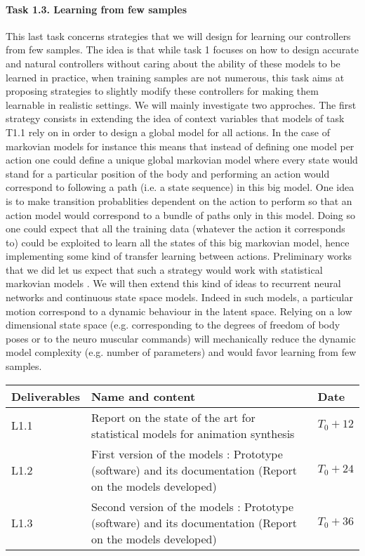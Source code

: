 \paragraph{Task 1.3. Learning from few samples}
This last task concerns strategies that we will design for learning our controllers from few samples. The idea is that while task 1 focuses on how to design accurate and natural controllers without caring about the ability of these models to be learned in practice, when training samples are not numerous, this task aims at proposing strategies to slightly modify these controllers for making them learnable in realistic settings.
We will mainly investigate two approches. The first strategy consists in extending the idea of context variables that models of task T1.1 rely on in order to design a global model for all actions. In the case of markovian models for instance this means that instead of defining one model per action one could define a unique global markovian model where every state would stand for a particular position of the body and performing an action would correspond to following a path (i.e. a state sequence) in this big model. 
One idea is to make transition probablities dependent on the action to perform so that an action model would correspond to a bundle of paths only in this model.  Doing so one could expect that all the training data (whatever the action it corresponds to) could be exploited to learn all the states of this big markovian model, hence implementing some kind of transfer learning between actions.  Preliminary works that we did let us expect that such a strategy would work with statistical markovian models \cite{DBLP:conf/icassp/DingRAP13, Radenen2014}. We will then extend this kind of ideas to recurrent neural networks and continuous state space models. Indeed in such models, a particular motion correspond to a dynamic behaviour in the latent space. Relying on a low dimensional state space (e.g. corresponding to the degrees of freedom of body poses or to the neuro muscular commands) will mechanically reduce the dynamic model complexity (e.g. number of parameters) and would favor learning from few samples.


\begin{tabular}{|p{3cm}|p{10cm}|p{1.5cm}|}\hline
Deliverables & Name and content  & Date  \\\hline
L1.1  & Report on the state of the art for statistical models for animation synthesis &  $T_0+12$ \\\hline
L1.2  & First version of the models : Prototype (software) and its documentation (Report on the models developed) & $T_0+24$ \\\hline
L1.3  & Second version of the models : Prototype (software) and its documentation (Report on the models developed)  & $T_0+36$ \\\hline
\end{tabular}

